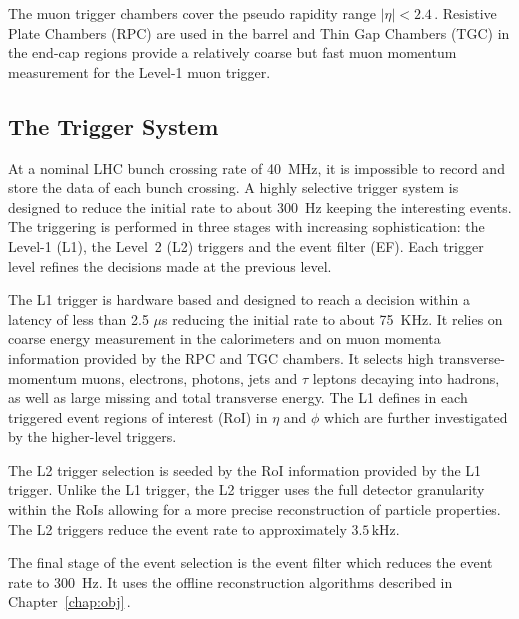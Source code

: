 The muon trigger chambers cover the pseudo rapidity range $|\eta| < 2.4\,.$ Resistive Plate Chambers
(RPC) are used  in the barrel and Thin Gap Chambers (TGC) in the end-cap regions
provide a relatively coarse but fast muon momentum measurement for the Level-1 muon trigger.


\subsection{The Trigger System}
At a nominal LHC  bunch crossing rate of 40~MHz, it is impossible to record and store 
the data of each bunch crossing. A highly selective  trigger system is designed to reduce the initial rate to about 300~Hz
keeping the interesting events. The triggering is performed in three stages with increasing sophistication: the
Level-1 (L1), the Level~2 (L2) triggers and the event filter (EF). Each trigger level
refines the decisions made at the previous level.

The L1 trigger is hardware based and  designed to reach a decision within a latency of less than 2.5 $\mu$s reducing the initial
rate to about 75~KHz. It  relies on coarse energy measurement in the calorimeters and on muon 
momenta information provided by the RPC and TGC chambers. It selects
high transverse-momentum muons, electrons, photons, jets and  $\tau$ 
leptons decaying into hadrons, as well as large missing and total transverse energy.
The L1 defines in each triggered event regions of interest (RoI) 
in  $\eta$ and $\phi$ which are further investigated by the higher-level triggers.

The L2 trigger  selection is seeded by the RoI information provided by the L1 trigger. Unlike the L1 trigger,
the L2 trigger uses the full detector granularity within the RoIs allowing for a more precise reconstruction of particle properties.
The L2 triggers  reduce the event rate to approximately $3.5\,\text{kHz}$.

The final stage of the event selection is the event filter which reduces
the event rate to 300~Hz. It uses the offline reconstruction algorithms described in Chapter~\ref{chap:obj}$\,$.


